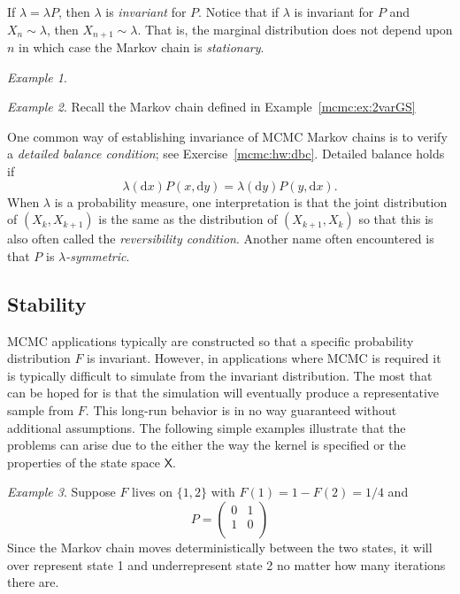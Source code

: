 \documentclass[12pt]{article}
\theoremstyle{plain}
\theoremstyle{definition}
\theoremstyle{remark}
\newtheorem{example}{Example}[section]
\newcommand{\df}{\mathrm{d}}
\newcommand{\X}{\mathsf{X}}
\begin{document}
If $\lambda = \lambda P$, then $\lambda$ is {\em invariant} for $P$.
Notice that if $\lambda$ is invariant for $P$ and $X_n \sim \lambda$,
then $X_{n+1} \sim \lambda$.  That is, the marginal distribution does
not depend upon $n$ in which case the Markov chain is {\em
  stationary}.

\begin{example}
  \end{example}

\begin{example}
  Recall the Markov chain defined in Example~\eqref{mcmc:ex:2varGS}
\end{example}


One common way of establishing invariance of MCMC Markov chains is to
verify a {\em detailed balance condition}; see
Exercise~\ref{mcmc:hw:dbc}.  Detailed balance holds if
\begin{equation}
   \label{mcmc:eq:dbc}
   \lambda(\df x) P(x, \df y) = \lambda(\df y) P(y, \df x). 
 \end{equation}
 When $\lambda$ is a probability measure, one interpretation is that
 the joint distribution of $(X_k, X_{k+1})$ is the same as the
 distribution of $(X_{k+1}, X_{k})$ so that this is also often called
 the {\em reversibility condition}.  Another name often encountered is
 that $P$ is {\em $\lambda$-symmetric}.

 \subsection{Stability}
 \label{mcmc:sec:stability}
 MCMC applications typically are constructed so that a specific
 probability distribution $F$ is invariant.  However, in applications
 where MCMC is required it is typically difficult to simulate from the
 invariant distribution.  The most that can be hoped for is that the
 simulation will eventually produce a representative sample from $F$.
 This long-run behavior is in no way guaranteed without additional
 assumptions. The following simple examples illustrate that the
 problems can arise due to the either the way the kernel is specified
 or the properties of the state space $\X$.

 \begin{example}
   \label{mcmc:ex:detmc}
   Suppose $F$ lives on $\{ 1, 2\}$ with $F(1) = 1 - F(2) = 1/4$ and
   \[
     P = \begin{pmatrix}
       0 & 1 \\
       1 & 0 \\
       \end{pmatrix}
   \]
   Since the Markov chain moves deterministically between the two
   states, it will over represent state 1 and underrepresent state 2
   no matter how many iterations there are.
 \end{example}
\end{document}
